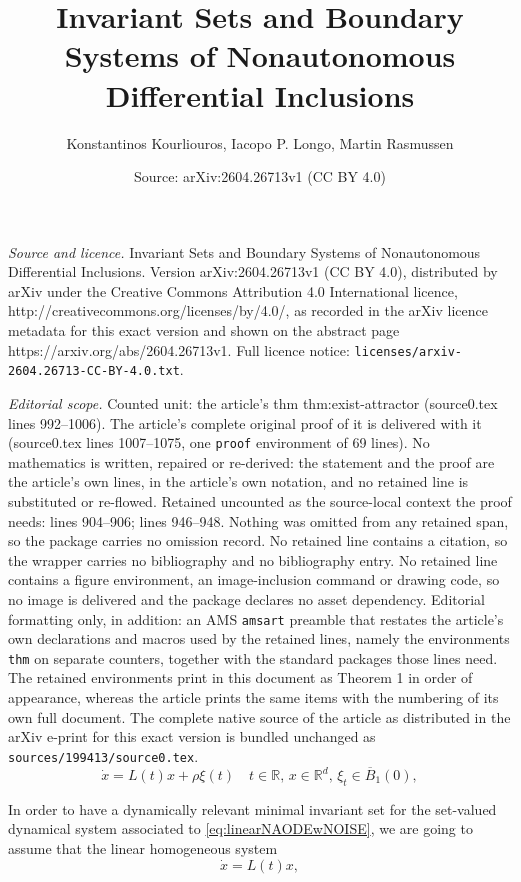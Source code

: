 \documentclass[10pt,a4paper]{amsart}
\title{Invariant Sets and Boundary Systems of Nonautonomous Differential Inclusions}
\author{Konstantinos Kourliouros, Iacopo P. Longo, Martin Rasmussen}
\date{Source: arXiv:2604.26713v1 (CC BY 4.0)}
\newcommand{\R}{\mathbb{R}}
\begin{document}
\maketitle

\noindent\emph{Source and licence.} Invariant Sets and Boundary Systems of Nonautonomous Differential Inclusions. Version arXiv:2604.26713v1 (CC BY 4.0), distributed by arXiv under the Creative Commons Attribution 4.0 International licence, http://creativecommons.org/licenses/by/4.0/, as recorded in the arXiv licence metadata for this exact version and shown on the abstract page https://arxiv.org/abs/2604.26713v1. Full licence notice: \texttt{licenses/arxiv-2604.26713-CC-BY-4.0.txt}.\par\smallskip

\noindent\textit{Editorial scope.} Counted unit: the article's thm thm:exist-attractor (source0.tex lines 992--1006). The article's complete original proof of it is delivered with it (source0.tex lines 1007--1075, one \texttt{proof} environment of 69 lines). No mathematics is written, repaired or re-derived: the statement and the proof are the article's own lines, in the article's own notation, and no retained line is substituted or re-flowed.  Retained uncounted as the source-local context the proof needs: lines 904--906; lines 946--948.  Nothing was omitted from any retained span, so the package carries no omission record.  No retained line contains a citation, so the wrapper carries no bibliography and no bibliography entry.  No retained line contains a figure environment, an image-inclusion command or drawing code, so no image is delivered and the package declares no asset dependency.  Editorial formatting only, in addition: an AMS \texttt{amsart} preamble that restates the article's own declarations and macros used by the retained lines, namely the environments \texttt{thm} on separate counters, together with the standard packages those lines need.  The retained environments print in this document as Theorem 1 in order of appearance, whereas the article prints the same items with the numbering of its own full document.  The complete native source of the article as distributed in the arXiv e-print for this exact version is bundled unchanged as \texttt{sources/199413/source0.tex}.
\begin{equation}\label{eq:linearNAODEwNOISE}
    \dot x =L(t)x+ \rho \xi(t)\quad t\in\R,\, x\in\R^d,\, \xi_t \in \overline B_1(0),
\end{equation}

In order to have a dynamically relevant minimal invariant set for the set-valued dynamical system associated to \eqref{eq:linearNAODEwNOISE}, we are going to assume that the linear homogeneous system \begin{equation}\label{eq:linearNAODE}
\dot x=L(t)x,    
\end{equation} 
\end{document}
